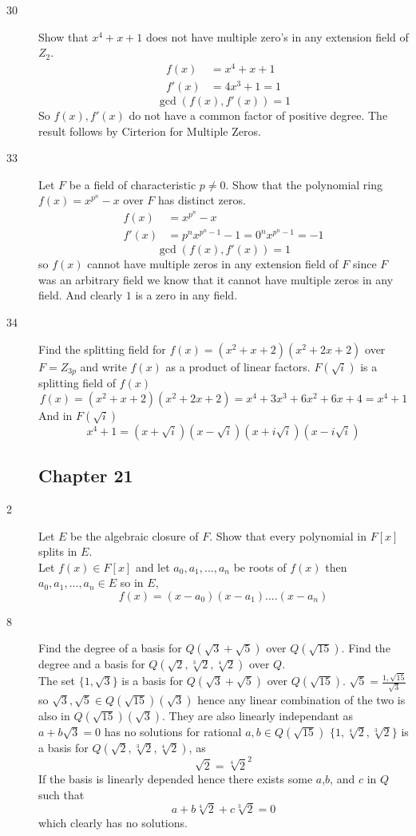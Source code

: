 \documentclass[11pt]{article}
\begin{document}
\begin{description}
	\item[30] Show that $x^4 + x + 1$ does not have multiple zero's in any
		extension field of $Z_2$.\\
		\begin{align*}
			f(x) &= x^4 + x + 1 \\
			f'(x) &= 4x^3 + 1 = 1
		\end{align*}
		$$\gcd(f(x), f'(x)) = 1$$
		So $f(x), f'(x)$ do not have a common factor of positive
		degree. The result follows by Cirterion for Multiple Zeros.
	\item[33] Let $F$ be a field of characteristic $p \neq 0$. Show that the
		polynomial ring $f(x) = x^{p^n}-x$ over $F$ has distinct
		zeros.
		\begin{align*}
			f(x) &= x^{p^n}-x\\
			f'(x) &=p^nx^{p^n-1}-1 = 0^nx^{p^n-1} = -1
		\end{align*}
		$$\gcd(f(x), f'(x)) = 1$$ so $f(x)$ cannot have multiple zeros
		in any extension field of $F$ since $F$ was an arbitrary field
		we know that it cannot have multiple zeros in any field. And
		clearly $1$ is a zero in any field.
	\item[34] Find the splitting field for $f(x) = (x^2+x+2)(x^2+2x+2)$ over
		$ F = Z_{3p} $ and write $f(x)$ as a product of linear factors.
		$F(\sqrt{i})$ is a splitting field of $f(x)$
		$$f(x) = (x^2+x+2)(x^2+2x+2) = x^4 + 3x^3 + 6x^2 + 6x + 4 = x^4 +
		1 $$
		And in $F(\sqrt i)$
		$$ x^4 + 1 = (x+\sqrt i)(x-\sqrt i)(x + i\sqrt i)(x - i \sqrt i) $$
	\subsection{Chapter 21}
	\item[2] Let $E$ be the algebraic closure of $F$. Show that every
		polynomial in $F[x]$ splits in $E$.\\
		Let $f(x) \in F[x]$ and let $a_0,a_1,...,a_n$ be roots of
		$f(x)$ then $a_0,a_1,...,a_n \in E$ so in $E$, 
		$$f(x) = (x-a_0)(x-a_1)....(x - a_n)$$
	\item[8] Find the degree of a basis for $Q(\sqrt3 + \sqrt5)$ over
		$Q(\sqrt{15})$. Find the degree and a basis for $Q(\sqrt2,
		\sqrt[3]{2},\sqrt[4]{2})$ over $Q$.\\
		The set $\{1,\sqrt{3}\}$ is a basis for $Q(\sqrt3+\sqrt5)$ over
		$Q(\sqrt{15})$. $\sqrt5 = \frac{1,\sqrt{15}}{\sqrt{3}}$ so $\sqrt{3},
		\sqrt{5} \in Q(\sqrt{15})(\sqrt{3})$ hence any linear
		combination of the two is also in $Q(\sqrt{15})(\sqrt3)$. They
		are also linearly independant as $a+b\sqrt3 = 0$ has no
		solutions for rational $a,b \in Q(\sqrt{15})$
		$\{1,\sqrt[4]{2},\sqrt[3]{2}\}$ is a basis for $Q(\sqrt 2,
		\sqrt[3]{2}, \sqrt[4]{2})$, as
			$$ \sqrt 2  = \sqrt[4]{2}^2 $$
		If the basis is linearly depended hence there exists some
		$a$,$b$, and $c$ in $Q$ such that 
		$$a + b\sqrt[4]2 + c \sqrt[3]2 = 0$$
		which clearly has no solutions.
				

\end{description}
\end{document}
